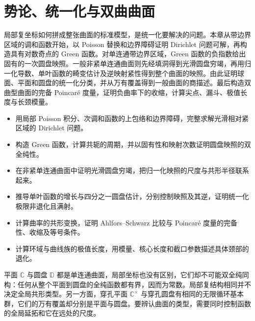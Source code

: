 
% 
% 

\chapter{势论、统一化与双曲曲面}
\label{g4:ch:05}

\begin{chapterabstract}
	局部复坐标如何拼成整张曲面的标准模型，是统一化要解决的问题。本章从带边界区域的调和函数开始，以 Poisson 替换和边界障碍证明 Dirichlet 问题可解，再构造具有对数奇点的 Green 函数。对单连通带边界区域，Green 函数的负指数给出固有的一次圆盘映照。一般非紧单连通曲面则先经填洞得到光滑圆盘穷竭，再用归一化导数、单叶函数的畸变估计及逆映射紧性得到整个曲面的映照。由此证明球面、平面和圆盘的统一化分类，并从万有覆盖得到一般曲面的商描述。最后构造双曲型曲面的完备 Poincaré 度量，证明负曲率下的收缩，计算尖点、漏斗、极值长度与长颈模量。
\end{chapterabstract}

\begin{learninggoals}
	\begin{itemize}
		\item 用局部 Poisson 积分、次调和函数的上包络和边界障碍，完整求解光滑相对紧区域的 Dirichlet 问题。
		\item 构造 Green 函数，计算共轭的周期，并以固有性和映射次数证明圆盘映照的双全纯性。
		\item 在非紧单连通曲面中证明光滑圆盘穷竭，把归一化映照的尺度与共形半径联系起来。
		\item 推导单叶函数的增长与四分之一圆盘估计，分别控制映照及其逆，证明统一化极限非退化且满射。
		\item 计算曲率的共形变换，证明 Ahlfors--Schwarz 比较与 Poincaré 度量的完备性、收缩及等号条件。
		\item 计算环域与曲线族的极值长度，用模量、核心长度和截口参数描述具体颈部的退化。
	\end{itemize}
\end{learninggoals}

平面 \(\mathbb C\) 与圆盘 \(\mathbb D\) 都是单连通曲面，局部坐标也没有区别，它们却不可能双全纯同构：任何从整个平面到圆盘的全纯函数都有界，因而为常数。局部复结构相同并不决定全局共形类型。另一方面，穿孔平面 \(\mathbb C^\times\) 与穿孔圆盘有相同的无限循环基本群，它们的万有覆盖却分别是平面与圆盘。要辨认曲面的类型，需要同时控制函数的全局延拓和它在远处的尺度。

